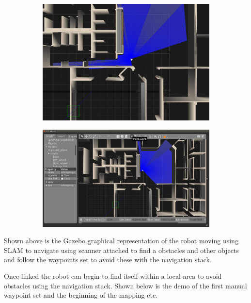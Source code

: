 \documentclass[a4paper, 10pt]{IEEEconf}
\begin{document}
\begin{figure}[H]
\begin{subfigure}[b]{0.45\textwidth}
  	\includegraphics[width=\textwidth]{images/room1}
  	\label{fig:Live view of robot moving through rooms}
\end{subfigure}
\hfill
\begin{subfigure}[b]{0.55\textwidth}
  	\includegraphics[width=\textwidth]{images/room2}
  	\label{fig:Robot following waypoint paths Gazebo view}
\end{subfigure}
\end{figure}

Shown above is the Gazebo graphical representation of the robot moving using SLAM to navigate using scanner attached to find a obstacles and other objects and follow the waypoints set to avoid these with the navigation stack.

Once linked the robot can begin to find itself within a local area to avoid obstacles using the navigation stack. Shown below is the demo of the first manual waypoint set and the beginning of the mapping etc.
\end{document}
